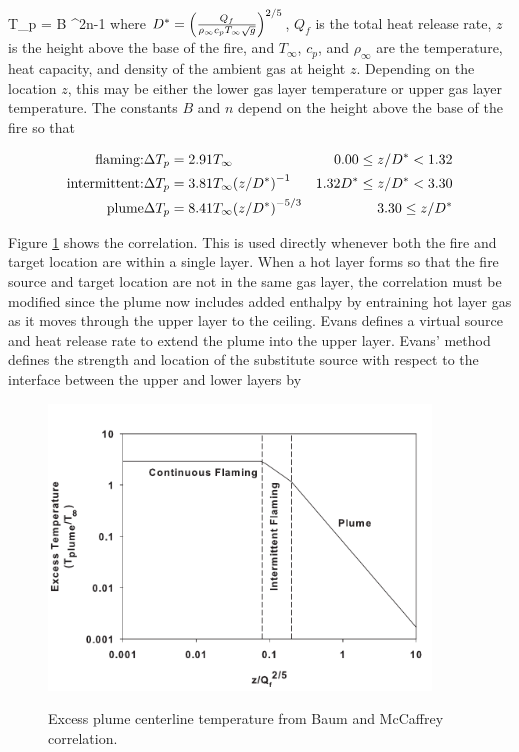 \be \Delta T_p = B ^{2n-1} \ee
where $D^* = { \left( {\frac{Q_f}{\rho_\infty c_p T_\infty \sqrt{g}}} \right) }^{2/5}$,  $Q_f$ is the total heat release rate, $z$ is the height above the base of the fire, and $T_\infty$, $c_p$, and $\rho_\infty$ are the temperature, heat capacity, and density of the ambient gas at height $z$. Depending on the location $z$, this may be either the lower gas layer temperature or upper gas layer temperature. The constants $B$ and $n$ depend on the height above the base of the fire so that

\begin{eqnarray}
\textnormal{flaming:} & \Delta T_p = 2.91 T_\infty  & 0.00 \leq z/D^* <1.32\nonumber \\
\textnormal{intermittent:} & \Delta T_p = 3.81 T_\infty { \left( {z/D^*} \right) }^{-1}  & 1.32 D^* \leq z/D^* <  3.30 \nonumber \\
\textnormal{plume} & \Delta T_p = 8.41 T_\infty  { \left( {z/D^*} \right) }^{-5/3} &  3.30 \leq z/D^* \nonumber
\end{eqnarray}

Figure \ref{fig:Plume_Temp} shows the correlation. This is used directly whenever both the fire and target location are within a single layer. When a hot layer forms so that the fire source and target location are not in the same gas layer, the correlation must be modified since the plume now includes added enthalpy by entraining hot layer gas as it moves through the upper layer to the ceiling. Evans \cite{Evans:1984} defines a virtual source and heat release rate  to extend the plume into the upper layer. Evans' method defines the strength and location of the substitute source with respect to the interface between the upper and lower layers by

\begin{figure}
\begin{center}
\includegraphics[width=4.0in]{FIGURES/Theory/Plume_Temperature}\\
\end{center}
\caption{Excess plume centerline temperature from Baum and McCaffrey correlation.}
 \label{fig:Plume_Temp}
\end{figure}

